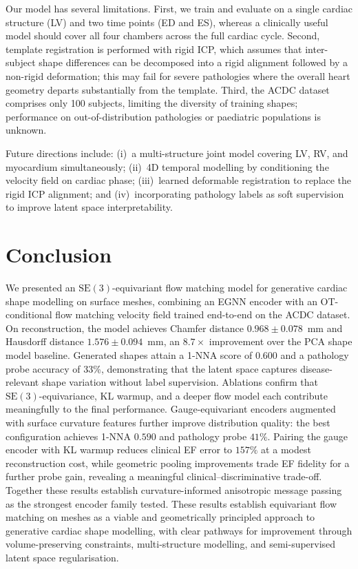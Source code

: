 \documentclass{article}
\newcommand{\SE}{\mathrm{SE}(3)}
\begin{document}
Our model has several limitations.
First, we train and evaluate on a single cardiac structure (LV) and two
time points (ED and ES), whereas a clinically useful model should cover
all four chambers across the full cardiac cycle.
Second, template registration is performed with rigid ICP, which assumes
that inter-subject shape differences can be decomposed into a rigid
alignment followed by a non-rigid deformation; this may fail for severe
pathologies where the overall heart geometry departs substantially from
the template.
Third, the ACDC dataset comprises only 100 subjects, limiting the
diversity of training shapes; performance on out-of-distribution
pathologies or paediatric populations is unknown.

Future directions include: (i)~a multi-structure joint model covering
LV, RV, and myocardium simultaneously; (ii)~4D temporal modelling by
conditioning the velocity field on cardiac phase; (iii)~learned
deformable registration to replace the rigid ICP alignment; and
(iv)~incorporating pathology labels as soft supervision to improve
latent space interpretability.

\section{Conclusion}
\label{sec:conclusion}

We presented an $\SE$-equivariant flow matching model for generative
cardiac shape modelling on surface meshes, combining an EGNN encoder with
an OT-conditional flow matching velocity field trained end-to-end on the
ACDC dataset.
On reconstruction, the model achieves Chamfer distance $0.968 \pm 0.078$~mm
and Hausdorff distance $1.576 \pm 0.094$~mm, an $8.7\times$ improvement
over the PCA shape model baseline.
Generated shapes attain a 1-NNA score of 0.600 and a pathology probe
accuracy of 33\%, demonstrating that the latent space captures
disease-relevant shape variation without label supervision.
Ablations confirm that $\SE$-equivariance, KL warmup, and a deeper
flow model each contribute meaningfully to the final performance.
Gauge-equivariant encoders augmented with surface curvature features
further improve distribution quality: the best configuration achieves
1-NNA $0.590$ and pathology probe $41\%$.
Pairing the gauge encoder with KL warmup reduces clinical EF error to
$157\%$ at a modest reconstruction cost, while geometric pooling
improvements trade EF fidelity for a further probe gain, revealing a
meaningful clinical--discriminative trade-off.
Together these results establish curvature-informed anisotropic message
passing as the strongest encoder family tested.
These results establish equivariant flow matching on meshes as a viable
and geometrically principled approach to generative cardiac shape
modelling, with clear pathways for improvement through volume-preserving
constraints, multi-structure modelling, and semi-supervised latent
space regularisation.



\end{document}
